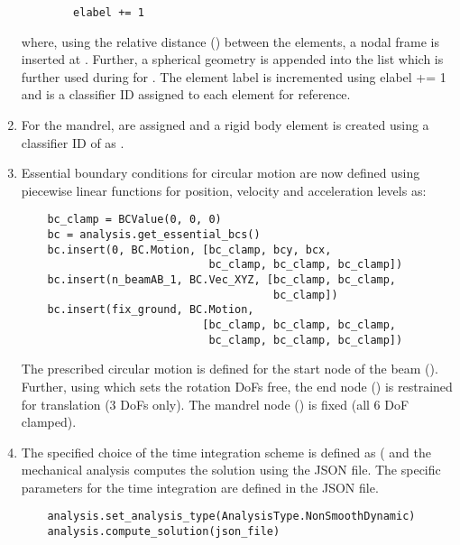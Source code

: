 \begin{enumerate}
\begin{tcolorbox}
\begin{lstlisting}
        elabel += 1
    \end{lstlisting}\end{tcolorbox}    
   where, using the relative distance () between the elements, a nodal frame is inserted at . Further, a spherical geometry is appended into the list  which is further used during  for . The element label  is incremented using elabel += 1 and \pythoninline{[10]} is a classifier ID assigned to each element for reference.
    \item For the mandrel,  are assigned and a rigid body element is created using a classifier ID of \pythoninline{[298]} as . 
    \item Essential boundary conditions for circular motion are now defined using piecewise linear functions  for position, velocity and acceleration levels as:
    \pythonstyle
    \begin{tcolorbox}\begin{lstlisting}
    bc_clamp = BCValue(0, 0, 0)
    bc = analysis.get_essential_bcs()
    bc.insert(0, BC.Motion, [bc_clamp, bcy, bcx, 
                             bc_clamp, bc_clamp, bc_clamp])
    bc.insert(n_beamAB_1, BC.Vec_XYZ, [bc_clamp, bc_clamp, 
                                       bc_clamp])
    bc.insert(fix_ground, BC.Motion,
                            [bc_clamp, bc_clamp, bc_clamp, 
                             bc_clamp, bc_clamp, bc_clamp])
    \end{lstlisting}\end{tcolorbox}
    The prescribed circular motion is defined for the start node of the beam (). Further, using  which sets the rotation DoFs free, the end node () is restrained for translation (3 DoFs only). The mandrel node () is fixed (all 6 DoF clamped).        
    \item The specified choice of the time integration scheme is defined as ( and the mechanical analysis computes the solution using the JSON file. The specific parameters for the time integration are defined in the JSON file.
    \pythonstyle
    \begin{tcolorbox}\begin{lstlisting}
    analysis.set_analysis_type(AnalysisType.NonSmoothDynamic)
    analysis.compute_solution(json_file)
    \end{lstlisting}\end{tcolorbox}    
\end{enumerate}

